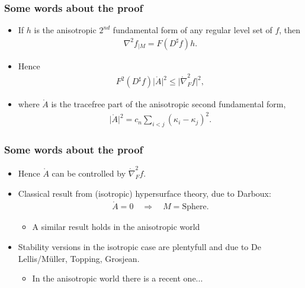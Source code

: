 \documentclass{beamer}
\newcommand{\mr}{\mathring}
\newcommand{\8}{\infty}
\newcommand{\ka}{\kappa}
\newcommand{\n}{\nabla}
\newcommand{\eq}[1]{\begin{equation}\begin{alignedat}{2} #1 \end{alignedat}\end{equation}}
\newcommand{\abs}[1]{\lvert #1\rvert}
\newcommand{\Ra}{\Rightarrow}
\newcommand{\q}{\quad}
\begin{document}
\begin{frame} 
\frametitle{Some words about the proof}

\begin{itemize}
\item[] If $h$ is the anisotropic $2^{nd}$ fundamental form of any regular level set of $f$, then
\eq{\n^{2}f_{| M}=F(D^{\sharp} f)h.}
\item[] Hence
\eq{F^{2}(D^{\sharp}f)\abs{\mr{A}}^{2}\leq \abs{\mr\n^{2}_{F}f}^{2},  }
\item[] where $\mr{A}$ is the tracefree part of the anisotropic second fundamental form, 
\eq{\abs{\mr{A}}^{2}=c_{n}\sum_{i<j}(\ka_{i}-\ka_{j})^{2}.} 
\end{itemize}
\end{frame}


\begin{frame} 
\frametitle{Some words about the proof}
\begin{itemize}
\item[] Hence $\mr{A}$ can be controlled by $\mr\n^{2}_{F} f$.
\item[] Classical result from (isotropic) hypersurface theory, due to Darboux:
\eq{\mr{A}=0\q\Ra\q M = \mbox{Sphere}.}
	\begin{itemize}
		\item A similar result holds in the anisotropic world\footnotemark {} 
	\end{itemize}
\item[] Stability versions in the isotropic case are plentyfull and due to De Lellis/M\"uller, Topping, Grosjean.
	\begin{itemize}
		\item In the anisotropic world there is a recent one...
	\end{itemize}
\end{itemize}
\end{frame}
\end{document}
